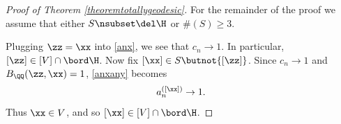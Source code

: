 \begin{proof}[Proof of Theorem \ref{theoremtotallygeodesic}]
For the remainder of the proof we assume that either $S\nsubset\del\H$ or $\#(S)\geq 3$.

Plugging $\zz = \xx$ into \eqref{anx}, we see that $c_n\to 1$. In particular, $[\zz]\in[V]\cap\bord\H$. Now fix $[\xx]\in S\butnot\{[\zz]\}$. Since $c_n\to 1$ and $B_\QQ(\zz,\xx) = 1$, \eqref{anxany} becomes
\[
a_n^{([\xx])} \to 1.
\]
Thus $\xx\in V$, and so $[\xx]\in [V]\cap\bord\H$.

%
%
%
%
%
\end{proof}




